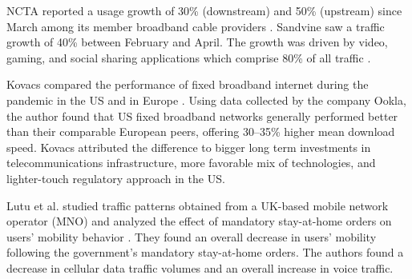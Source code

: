\documentclass[conference,10pt]{IEEEtran}
\begin{document}
NCTA reported a usage growth of 30\% (downstream) and 50\% (upstream) since March among its member broadband cable providers \cite{ncta}. Sandvine saw a traffic growth of 40\% between February and April. The growth was driven by video, gaming, and social sharing applications which comprise 80\% of all traffic \cite{sandvine}.

Kovacs compared the performance of fixed broadband internet during the pandemic in the US and in Europe \cite{kovacs}. Using data collected by the company Ookla, the author found that US fixed broadband networks generally performed better than their comparable European peers, offering 30--35\% higher mean download speed. Kovacs attributed the difference to bigger long term investments in telecommunications infrastructure, more favorable mix of technologies, and lighter-touch regulatory approach in the US.



Lutu et al. studied traffic patterns obtained from a UK-based mobile network operator (MNO) and analyzed the effect of mandatory stay-at-home orders on users' mobility behavior \cite{lutu2020mobile}. They found an overall decrease in users' mobility following the government’s mandatory stay-at-home orders. The authors found a decrease in cellular data traffic volumes and an overall increase in voice traffic.
\end{document}
